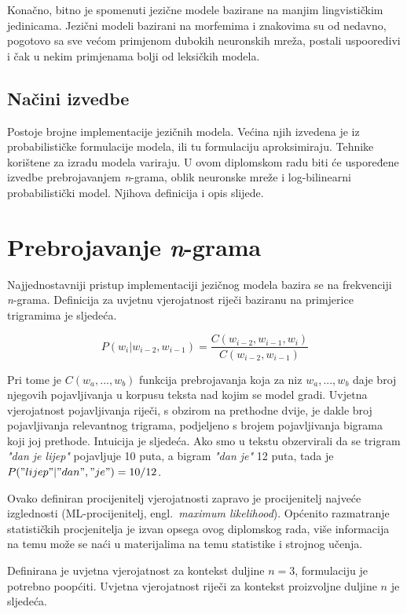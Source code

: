 \documentclass[times, utf8, diplomski, numeric]{fer}
\begin{document}
Konačno, bitno je spomenuti jezične modele bazirane na manjim lingvističkim jedinicama. Jezični modeli bazirani na morfemima i znakovima su od nedavno, pogotovo sa sve većom primjenom dubokih neuronskih mreža, postali uspooredivi i čak u nekim primjenama bolji od leksičkih modela.

\section{Načini izvedbe}

Postoje brojne implementacije jezičnih modela. Većina njih izvedena je iz probabilističke formulacije modela, ili tu formulaciju aproksimiraju. Tehnike korištene za izradu modela variraju. U ovom diplomskom radu biti će uspoređene izvedbe prebrojavanjem \textit{n}-grama, oblik neuronske mreže i log-bilinearni probabilistički model. Njihova definicija i opis slijede.

\chapter{Prebrojavanje \textit{n}-grama}

Najjednostavniji pristup implementaciji jezičnog modela bazira se na frekvenciji \textit{n}-grama. Definicija za uvjetnu vjerojatnost riječi baziranu na primjerice trigramima je sljedeća.

\[
P(w_i | w_{i - 2}, w_{i - 1}) = \frac{C(w_{i - 2}, w_{i - 1}, w_i)}{C(w_{i - 2}, w_{i - 1})}
\]

Pri tome je $C(w_a, ... , w_b)$ funkcija prebrojavanja koja za niz $w_a, ... , w_b$ daje broj njegovih pojavljivanja u korpusu teksta nad kojim se model gradi. Uvjetna vjerojatnost pojavljivanja riječi, s obzirom na prethodne dvije, je dakle broj pojavljivanja relevantnog trigrama, podjeljeno s brojem pojavljivanja bigrama koji joj prethode. Intuicija je sljedeća. Ako smo u tekstu obzervirali da se trigram \textit{"dan je lijep"} pojavljuje 10 puta, a bigram \textit{"dan je"} 12 puta, tada je $P("lijep" | "dan", "je") = 10 / 12$.

Ovako definiran procijenitelj vjerojatnosti zapravo je procijenitelj  najveće izglednosti (ML-procijenitelj, engl.\ \textit{maximum likelihood}). Općenito razmatranje statističkih procjenitelja je izvan opsega ovog diplomskog rada, više informacija na temu može se naći u materijalima na temu statistike i strojnog učenja.

Definirana je uvjetna vjerojatnost za kontekst duljine $n = 3$, formulaciju je potrebno poopćiti. Uvjetna vjerojatnost riječi za kontekst proizvoljne duljine $n$ je sljedeća.
\end{document}

